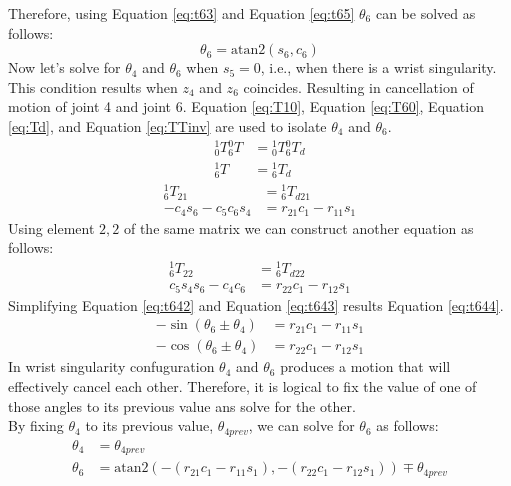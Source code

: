 Therefore, using Equation \ref{eq:t63} and Equation \ref{eq:t65} $\theta_6$ can be solved as follows:
\begin{equation} \label{eq:t66}
    \theta_6=\mathrm{atan2}(s_6,c_6)
\end{equation}
Now let's solve for $\theta_4$ and $\theta_6$ when $s_5=0$, i.e., when there is a wrist singularity.
This condition results when $z_4$ and $z_6$ coincides. Resulting in cancellation of motion of joint 4 and joint 6.
Equation \ref{eq:T10}, Equation \ref{eq:T60}, Equation \ref{eq:Td}, and Equation \ref{eq:TTinv} are used to isolate $\theta_4$ and $\theta_6$.
\begin{equation} \label{eq:t641}
    \begin{aligned}
        {_0^{1}}T{_6^{0}}T & ={_0^{1}}T{_6^{0}}T_d \\
        {_6^{1}}T & ={_6^{1}}T_d
    \end{aligned}
\end{equation}
\begin{equation} \label{eq:t642}
    \begin{aligned}
        {_6^{1}}T_{21} & ={_6^{1}}T_{d21}\\
        -c_4s_6 - c_5c_6s_4 &= r_{21}c_1 - r_{11}s_1
    \end{aligned}
\end{equation}
Using element $2, 2$ of the same matrix we can construct another equation as follows:
\begin{equation} \label{eq:t643}
    \begin{aligned}
        {_6^{1}}T_{22} & ={_6^{1}}T_{d22}\\
        c_5s_4s_6 - c_4c_6 &= r_{22}c_1 - r_{12}s_1
    \end{aligned}
\end{equation}
Simplifying Equation \ref{eq:t642} and Equation \ref{eq:t643} results Equation \ref{eq:t644}.
\begin{equation} \label{eq:t644}
    \begin{aligned}
        -\sin(\theta_6\pm\theta_4) &= r_{21}c_1 - r_{11}s_1 \\
        -\cos(\theta_6\pm\theta_4) &= r_{22}c_1 - r_{12}s_1
    \end{aligned}
\end{equation}
In wrist singularity confuguration $\theta_4$ and $\theta_6$ produces a motion that will effectively cancel each other. 
Therefore, it is logical to fix the value of one of those angles to its previous value ans solve for the other.\\
By fixing $\theta_4$ to its previous value, $\theta_{4prev}$, we can solve for $\theta_6$ as follows:
\begin{equation} \label{eq:t645}
    \begin{aligned}
        \theta_4&=\theta_{4prev}\\
        \theta_6&=\mathrm{atan2}\left(-(r_{21}c_1 - r_{11}s_1), -(r_{22}c_1 - r_{12}s_1)\right)\mp\theta_{4prev}
    \end{aligned}
\end{equation}
